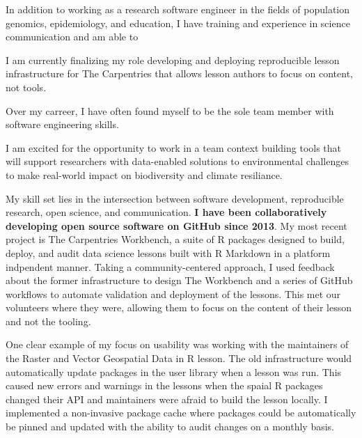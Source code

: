 In addition to working as a research software engineer in the fields of
population genomics, epidemiology, and education, I have training and
experience in science communication and am able to 

I am currently finalizing my role developing and deploying reproducible lesson
infrastructure for The Carpentries that allows lesson authors to focus on
content, not tools.

Over my carreer, I have often found myself to be the sole team member with
software engineering skills. 

I am excited for the opportunity to work in a team context building tools that
will support researchers with data-enabled solutions to environmental
challenges to make real-world impact on biodiversity and climate resiliance.


\vspace{1ex}


My skill set lies in the intersection between software development,
reproducible research, open science, and communication. 
\textbf{I have been collaboratively developing open source software on GitHub
since 2013}.
My most recent project is The Carpentries Workbench, a suite of R packages
designed to build, deploy, and audit data science lessons built with R Markdown
in a platform indpendent manner. Taking a community-centered approach, I used
feedback about the former infrastructure to design The Workbench and a series
of GitHub workflows to automate validation and deployment of the lessons.
This met our volunteers where they were, allowing them to focus on the content
of their lesson and not the tooling.

\vspace{1ex}

One clear example of my focus on usability was working with the maintainers of
the Raster and Vector Geospatial Data in R lesson. The old infrastructure would
automatically update packages in the user library when a lesson was run. This
caused new errors and warnings in the lessons when the spaial R packages changed
their API and maintainers were afraid to build the lesson locally. I implemented
a non-invasive package cache where packages could be automatically be pinned and
updated with the ability to audit changes on a monthly basis.


